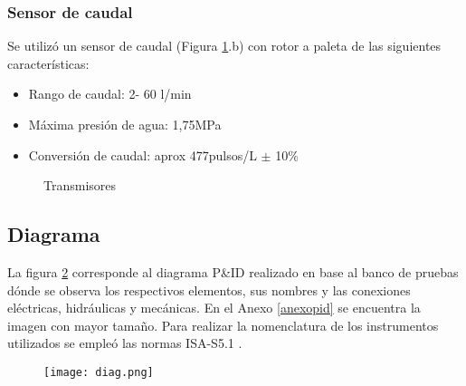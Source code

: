 \subsubsection{Sensor de caudal}
Se utilizó un sensor de caudal (Figura \ref{fig:transd}.b) con rotor a paleta de las siguientes características:
\begin{itemize}
	\item Rango de caudal: 2- 60 l/min
	\item Máxima presión de agua: 1,75MPa
	\item Conversión de caudal: aprox 477pulsos/L $\pm$ 10\%
\end{itemize}


\begin{figure}[htbp]
	\centering
	\caption{Transmisores} \label{fig:transd}
\end{figure}





\subsection{Diagrama}
La figura \ref{fig:diag} corresponde al diagrama P\&ID realizado en base al banco de pruebas dónde se observa los respectivos elementos, sus nombres y las conexiones eléctricas, hidráulicas y mecánicas. En el Anexo \ref{anexopid} se encuentra la imagen con mayor tamaño.
 Para realizar la nomenclatura de los instrumentos utilizados se empleó las normas ISA-S5.1 \cite{ISA}. 

\begin{figure}[htb]
	\centering
	\texttt{[image: diag.png]}
	\label{fig:diag}
\end{figure}

